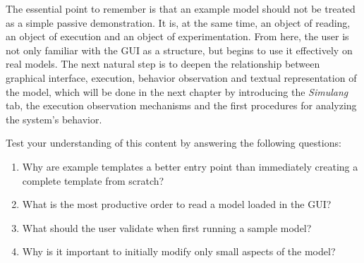 The essential point to remember is that an example model should not be treated as a simple passive demonstration. It is, at the same time, an object of reading, an object of execution and an object of experimentation. From here, the user is not only familiar with the GUI as a structure, but begins to use it effectively on real models. The next natural step is to deepen the relationship between graphical interface, execution, behavior observation and textual representation of the model, which will be done in the next chapter by introducing the \textit{Simulang} tab, the execution observation mechanisms and the first procedures for analyzing the system's behavior.

Test your understanding of this content by answering the following questions:

\begin{enumerate}
\item Why are example templates a better entry point than immediately creating a complete template from scratch?

\item What is the most productive order to read a model loaded in the GUI?

\item What should the user validate when first running a sample model?

\item Why is it important to initially modify only small aspects of the model?
\end{enumerate}
